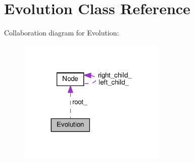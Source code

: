 \hypertarget{classEvolution}{}\section{Evolution Class Reference}
\label{classEvolution}


Collaboration diagram for Evolution\+:
\nopagebreak
\begin{figure}[H]
\begin{center}
\leavevmode
\includegraphics[width=200pt]{classEvolution__coll__graph}
\end{center}
\end{figure}

